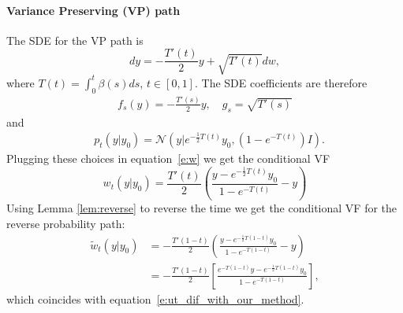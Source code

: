 \documentclass{article}
\makeatletter
\newcommand{\parr}[1]{\left (#1\right )}
\newcommand{\brac}[1]{\left [#1\right ]}
\newcommand{\ie}{{i.e.}}
\def\eqref#1{equation~\ref{#1}}
\def\gN{{\mathcal{N}}}
\renewcommand*{\ie}{{\it i.e.}\@\xspace}
\makeatother
\begin{document}
\paragraph{Variance Preserving (VP) path}
The SDE for the VP path is 
\begin{equation*}
    dy = -\frac{T'(t)}{2}y + \sqrt{T'(t)}dw,
\end{equation*}
where $T(t)=\int_0^t \beta(s)ds$, $t\in [0,1]$. The SDE coefficients are therefore
\begin{align*}
    f_s(y) = -\frac{T'(s)}{2}y, \quad g_s = \sqrt{T'(s)} 
\end{align*}
and
\begin{align*}
    &p_t(y \vert  y_0) = \gN(y \vert e^{-\frac{1}{2}T(t)}y_0, (1-e^{-T(t)})I).
\end{align*}
Plugging these choices in \eqref{e:w} we get the conditional VF
\begin{equation}
    w_t(y\vert y_0) =\frac{T'(t)}{2}\parr{\frac{y-e^{-\frac{1}{2}T(t)}y_0}{1-e^{-T(t)}} -y }
\end{equation}
Using Lemma \ref{lem:reverse} to reverse the time we get the conditional VF for the reverse probability path:
\begin{align*}
    \tilde{w}_t(y|y_0) &= -\frac{T'(1-t)}{2}\parr{\frac{y-e^{-\frac{1}{2}T(1-t)}y_0}{1-e^{-T(1-t)}} -y } \\
    &= -\frac{T'(1-t)}{2}\brac{\frac{e^{-T(1-t)}y-e^{-\frac{1}{2}T(1-t)}y_0}{1-e^{-T(1-t)}}},
\end{align*}
which coincides with \eqref{e:ut_dif_with_our_method}.
\end{document}
